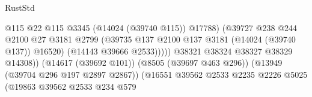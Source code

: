 \begin{lexlean}{RustStd}
\begin{coremodule}
                                                            @115
                                                            @22
                                                            @115
                                                            @3345
                                                            (@14024 (@39740 @115))
                                                            @17788)
                                                          (@39727
                                                            @238
                                                            @244
                                                            @2100
                                                            @27
                                                            @3181
                                                            @2799
                                                            (@39735
                                                              @137
                                                              @2100
                                                              @137
                                                              @3181
                                                              (@14024 (@39740 @137))
                                                              @16520)
                                                            (@14143 @39666 @2533)))))
                                                    @38321
                                                    @38324
                                                    @38327
                                                    @38329
                                                    @14308))
                                                (@14617 (@39692 @101))
                                                (@8505 (@39697 @463 @296))
                                                (@13949 (@39704 @296 @197 @2897 @2867))
                                                (@16551
                                                  @39562
                                                  @2533
                                                  @2235
                                                  @2226
                                                  @5025
                                                  (@19863
                                                    @39562
                                                    @2533
                                                    @234
                                                    @579

\end{coremodule}
\end{lexlean}
